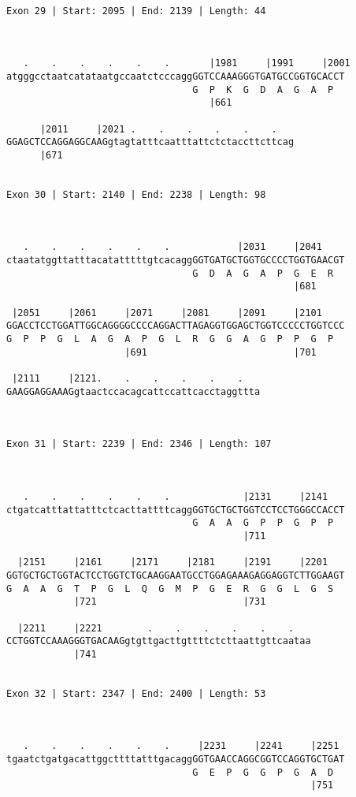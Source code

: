 \documentclass{article}
\begin{document}
\begin{Verbatim}
 
Exon 29 | Start: 2095 | End: 2139 | Length: 44



   .    .    .    .    .    .       |1981     |1991     |2001
atgggcctaatcatataatgccaatctcccaggGGTCCAAAGGGTGATGCCGGTGCACCT
                                 G  P  K  G  D  A  G  A  P  
                                    |661                    
  
      |2011     |2021 .    .    .    .    .    .   
GGAGCTCCAGGAGGCAAGgtagtatttcaatttattctctaccttcttcag
      |671                                         
  
 
Exon 30 | Start: 2140 | End: 2238 | Length: 98



   .    .    .    .    .    .            |2031     |2041    
ctaatatggttatttacatatttttgtcacaggGGTGATGCTGGTGCCCCTGGTGAACGT
                                 G  D  A  G  A  P  G  E  R  
                                                   |681     
  
 |2051     |2061     |2071     |2081     |2091     |2101    
GGACCTCCTGGATTGGCAGGGGCCCCAGGACTTAGAGGTGGAGCTGGTCCCCCTGGTCCC
G  P  P  G  L  A  G  A  P  G  L  R  G  G  A  G  P  P  G  P  
                     |691                          |701     
  
 |2111     |2121.    .    .    .    .    .   
GAAGGAGGAAAGgtaactccacagcattccattcacctaggttta
                                             
  
 
Exon 31 | Start: 2239 | End: 2346 | Length: 107



   .    .    .    .    .    .             |2131     |2141   
ctgatcatttattatttctcacttattttcaggGGTGCTGCTGGTCCTCCTGGGCCACCT
                                 G  A  A  G  P  P  G  P  P  
                                          |711              
  
  |2151     |2161     |2171     |2181     |2191     |2201   
GGTGCTGCTGGTACTCCTGGTCTGCAAGGAATGCCTGGAGAAAGAGGAGGTCTTGGAAGT
G  A  A  G  T  P  G  L  Q  G  M  P  G  E  R  G  G  L  G  S  
            |721                          |731              
  
  |2211     |2221        .    .    .    .    .    .   
CCTGGTCCAAAGGGTGACAAGgtgttgacttgttttctcttaattgttcaataa
            |741                                      
  
 
Exon 32 | Start: 2347 | End: 2400 | Length: 53



   .    .    .    .    .    .     |2231     |2241     |2251 
tgaatctgatgacattggcttttatttgacaggGGTGAACCAGGCGGTCCAGGTGCTGAT
                                 G  E  P  G  G  P  G  A  D  
                                                      |751  
  

\end{Verbatim}
\end{document}

